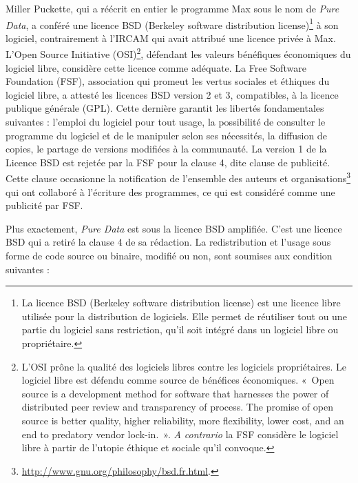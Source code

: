\documentclass{FramateX}
\begin{document}
\begin{refsection}
Miller Puckette, qui a réécrit en entier le programme Max sous le nom de
\textit{Pure Data}, a conféré une licence BSD (Berkeley software distribution
license)\footnote{La licence BSD (Berkeley software distribution
license) est une licence libre utilisée pour la distribution de
logiciels. Elle permet de réutiliser tout ou une partie du logiciel
sans restriction, qu'il soit intégré dans un logiciel
libre ou propriétaire.} à son logiciel, contrairement à l'IRCAM qui
avait attribué une licence privée à Max. L'Open Source Initiative
(OSI)\footnote{L'OSI prône la qualité des
logiciels libres contre les logiciels propriétaires. Le logiciel libre
est défendu comme source de bénéfices économiques. «~Open source is a
development method for software that harnesses the power of distributed
peer review and transparency of process. The promise of open source is
better quality, higher reliability, more flexibility, lower cost, and
an end to predatory vendor lock-in.~». \textit{A contrario} la FSF considère le
logiciel libre à partir de l'utopie éthique et sociale qu'il
convoque.}, défendant les valeurs bénéfiques économiques du logiciel
libre, considère cette licence comme adéquate. La Free Software
Foundation (FSF), association qui promeut les vertus sociales et
éthiques du logiciel libre, a attesté les licences BSD version 2 et 3,
compatibles, à la licence publique générale (GPL). Cette dernière
garantit les libertés fondamentales suivantes : l'emploi du logiciel
pour tout usage, la possibilité de consulter le programme du logiciel
et de le manipuler selon ses nécessités, la diffusion de copies, le
partage de versions modifiées à la communauté. La version 1 de la
Licence BSD est rejetée par la FSF pour la clause 4, dite clause de
publicité. Cette clause occasionne la notification de
l'ensemble des auteurs et
organisations\footnote{\url{http://www.gnu.org/philosophy/bsd.fr.html}.}
qui ont collaboré à l'écriture des programmes, ce qui est considéré
comme une publicité par FSF. 

Plus exactement, \textit{Pure Data} est sous la licence BSD amplifiée. C'est une
licence BSD qui a retiré la clause 4 de sa rédaction. La redistribution
et l'usage sous forme de code source ou binaire,
modifié ou non, sont soumises aux condition suivantes :


\end{refsection}
\end{document}
